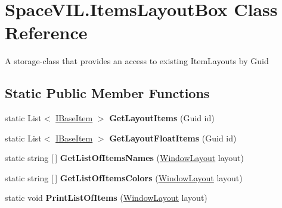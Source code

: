 \hypertarget{class_space_v_i_l_1_1_items_layout_box}{}\section{Space\+V\+I\+L.\+Items\+Layout\+Box Class Reference}
\label{class_space_v_i_l_1_1_items_layout_box}


A storage-\/class that provides an access to existing Item\+Layouts by Guid  


\subsection*{Static Public Member Functions}
\begin{DoxyCompactItemize}
\item 
\mbox{\label{class_space_v_i_l_1_1_items_layout_box_a8311ade3a00018b6e68d702dfaadbf18}} 
static List$<$ \mbox{\hyperlink{interface_space_v_i_l_1_1_core_1_1_i_base_item}{I\+Base\+Item}} $>$ {\bfseries Get\+Layout\+Items} (Guid id)
\item 
\mbox{\label{class_space_v_i_l_1_1_items_layout_box_ac5a748fb5baf721068ba4f1a0fa2a732}} 
static List$<$ \mbox{\hyperlink{interface_space_v_i_l_1_1_core_1_1_i_base_item}{I\+Base\+Item}} $>$ {\bfseries Get\+Layout\+Float\+Items} (Guid id)
\item 
\mbox{\label{class_space_v_i_l_1_1_items_layout_box_a1621d0da4015181db37b29b280d6452c}} 
static string \mbox{[}$\,$\mbox{]} {\bfseries Get\+List\+Of\+Items\+Names} (\mbox{\hyperlink{class_space_v_i_l_1_1_window_layout}{Window\+Layout}} layout)
\item 
\mbox{\label{class_space_v_i_l_1_1_items_layout_box_ac2c0a0c23e724315224d94e372863903}} 
static string \mbox{[}$\,$\mbox{]} {\bfseries Get\+List\+Of\+Items\+Colors} (\mbox{\hyperlink{class_space_v_i_l_1_1_window_layout}{Window\+Layout}} layout)
\item 
\mbox{\label{class_space_v_i_l_1_1_items_layout_box_a57ce1f6a3dbab9e37401a446aeeac016}} 
static void {\bfseries Print\+List\+Of\+Items} (\mbox{\hyperlink{class_space_v_i_l_1_1_window_layout}{Window\+Layout}} layout)
\end{DoxyCompactItemize}


